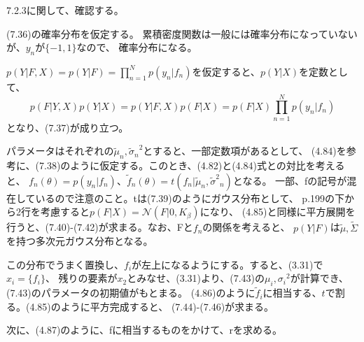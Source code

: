 \documentclass{jsarticle}
\begin{document}
7.2.3に関して、確認する。

(7.36)の確率分布を仮定する。
累積密度関数は一般には確率分布になっていないが、$y_n$が$\{-1, 1\}$なので、
確率分布になる。

$p(Y | F, X) = p(Y | F) = \prod_{n = 1}^N p(y_n | f_n)$を仮定すると、$p(Y | X)$を定数として、
\begin{equation}
p(F | Y, X)p(Y | X) = p(Y | F, X)p(F | X) = p(F | X)\prod_{n = 1}^N p(y_n | f_n)
\end{equation}
となり、(7.37)が成り立つ。

パラメータはそれぞれの$\tilde{\mu}_n, {\tilde{\sigma}_n}^2$とすると、一部定数項があるとして、
(4.84)を参考に、(7.38)のように仮定する。このとき、(4.82)と(4.84)式との対比を考えると、
$f_n(\theta)=p(y_n|f_n)$、$\tilde{f}_n(\theta) = t(f_n | \tilde{\mu}_n, {\tilde{\sigma}^2}_n)$となる。
一部、fの記号が混在しているので注意のこと。tは(7.39)のようにガウス分布として、
p.199の下から2行を考慮すると$p(F | X) = \mathcal{N}(F | 0, K_\beta)$になり、
(4.85)と同様に平方展開を行うと、(7.40)-(7.42)が求まる。なお、Fと$f_n$の関係を考えると、
$p(Y | F)$は$\tilde{\mu}, \tilde{\Sigma}$を持つ多次元ガウス分布となる。

この分布でうまく置換し、$f_i$が左上になるようにする。すると、(3.31)で$x_i = \{ f_i \}$、
残りの要素が$x_2$とみなせ、(3.31)より、(7.43)の$\mu_i, {\sigma_i}^2$が計算でき、
(7.43)のパラメータの初期値がもとまる。
(4.86)のように$\tilde{f}_i$に相当する、$t$で割る。(4.85)のように平方完成すると、
(7.44)-(7.46)が求まる。

次に、(4.87)のように、fに相当するものをかけて、rを求める。
\end{document}
